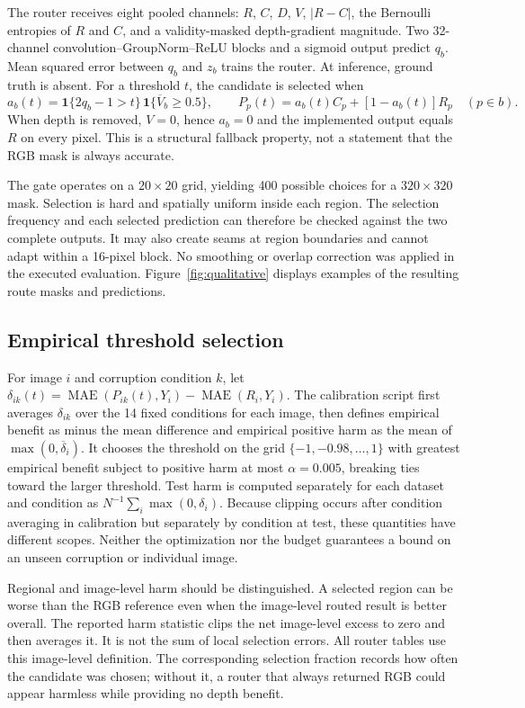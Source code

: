 \documentclass[11pt]{article}
\begin{document}
The router receives eight pooled channels: $R$, $C$, $D$, $V$, $|R-C|$, the Bernoulli entropies of $R$ and $C$, and a validity-masked depth-gradient magnitude. Two 32-channel convolution--GroupNorm--ReLU blocks and a sigmoid output predict $q_b$. Mean squared error between $q_b$ and $z_b$ trains the router. At inference, ground truth is absent. For a threshold $t$, the candidate is selected when
\begin{equation}
a_b(t)=\mathbf 1\{2q_b-1>t\}\,\mathbf 1\{\overline V_b\geq0.5\},\qquad
P_p(t)=a_b(t)C_p+[1-a_b(t)]R_p\quad(p\in b).
\end{equation}
When depth is removed, $V=0$, hence $a_b=0$ and the implemented output equals $R$ on every pixel. This is a structural fallback property, not a statement that the RGB mask is always accurate.

The gate operates on a $20\times20$ grid, yielding 400 possible choices for a $320\times320$ mask. Selection is hard and spatially uniform inside each region. The selection frequency and each selected prediction can therefore be checked against the two complete outputs. It may also create seams at region boundaries and cannot adapt within a 16-pixel block. No smoothing or overlap correction was applied in the executed evaluation. Figure~\ref{fig:qualitative} displays examples of the resulting route masks and predictions.

\subsection{Empirical threshold selection}
For image $i$ and corruption condition $k$, let $\delta_{ik}(t)=\operatorname{MAE}(P_{ik}(t),Y_i)-\operatorname{MAE}(R_i,Y_i)$. The calibration script first averages $\delta_{ik}$ over the 14 fixed conditions for each image, then defines empirical benefit as minus the mean difference and empirical positive harm as the mean of $\max(0,\overline\delta_i)$. It chooses the threshold on the grid $\{-1,-0.98,\ldots,1\}$ with greatest empirical benefit subject to positive harm at most $\alpha=0.005$, breaking ties toward the larger threshold. Test harm is computed separately for each dataset and condition as $N^{-1}\sum_i\max(0,\delta_i)$. Because clipping occurs after condition averaging in calibration but separately by condition at test, these quantities have different scopes. Neither the optimization nor the budget guarantees a bound on an unseen corruption or individual image.

Regional and image-level harm should be distinguished. A selected region can be worse than the RGB reference even when the image-level routed result is better overall. The reported harm statistic clips the net image-level excess to zero and then averages it. It is not the sum of local selection errors. All router tables use this image-level definition. The corresponding selection fraction records how often the candidate was chosen; without it, a router that always returned RGB could appear harmless while providing no depth benefit.
\end{document}
